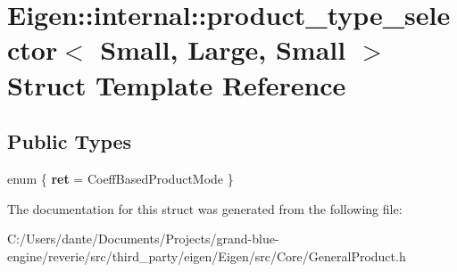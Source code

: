 \hypertarget{struct_eigen_1_1internal_1_1product__type__selector_3_01_small_00_01_large_00_01_small_01_4}{}\section{Eigen\+::internal\+::product\+\_\+type\+\_\+selector$<$ Small, Large, Small $>$ Struct Template Reference}
\label{struct_eigen_1_1internal_1_1product__type__selector_3_01_small_00_01_large_00_01_small_01_4}
\subsection*{Public Types}
\begin{DoxyCompactItemize}
\item 
\mbox{\label{struct_eigen_1_1internal_1_1product__type__selector_3_01_small_00_01_large_00_01_small_01_4_aff53e3ff748ce2737e025901bd99a56f}} 
enum \{ {\bfseries ret} = Coeff\+Based\+Product\+Mode
 \}
\end{DoxyCompactItemize}


The documentation for this struct was generated from the following file\+:\begin{DoxyCompactItemize}
\item 
C\+:/\+Users/dante/\+Documents/\+Projects/grand-\/blue-\/engine/reverie/src/third\+\_\+party/eigen/\+Eigen/src/\+Core/General\+Product.\+h\end{DoxyCompactItemize}
